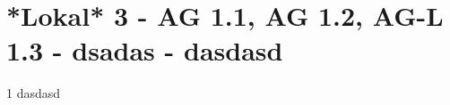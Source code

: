 \section{*Lokal* 3 - AG 1.1, AG 1.2, AG-L 1.3 - dsadas - dasdasd}

\begin{langesbeispiel} \item[1] %
dasdasd

\end{langesbeispiel}
